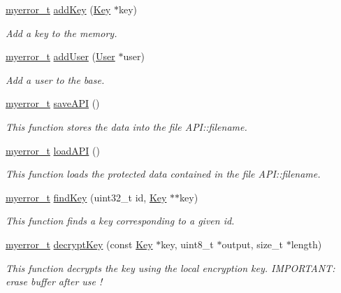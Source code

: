 \begin{DoxyCompactItemize}
\item 
\hyperlink{error_8hpp_acabd2917084445509becf54ab64a4bd0}{myerror\+\_\+t} \hyperlink{classAPI_a33f903bf549583040cbd4ced79821686}{add\+Key} (\hyperlink{classKey}{Key} $\ast$key)
\begin{DoxyCompactList}\small\item\em Add a key to the memory. \end{DoxyCompactList}\item 
\hyperlink{error_8hpp_acabd2917084445509becf54ab64a4bd0}{myerror\+\_\+t} \hyperlink{classAPI_abeba46623895fc9d5d831fb8f828e6da}{add\+User} (\hyperlink{classUser}{User} $\ast$user)
\begin{DoxyCompactList}\small\item\em Add a user to the base. \end{DoxyCompactList}\item 
\hyperlink{error_8hpp_acabd2917084445509becf54ab64a4bd0}{myerror\+\_\+t} \hyperlink{classAPI_ae9bf448b00701609e20c2167931b8975}{save\+A\+P\+I} ()
\begin{DoxyCompactList}\small\item\em This function stores the data into the file A\+P\+I\+::filename. \end{DoxyCompactList}\item 
\hyperlink{error_8hpp_acabd2917084445509becf54ab64a4bd0}{myerror\+\_\+t} \hyperlink{classAPI_a015f9ca96d3f5ab8af44fe2fe8e0215a}{load\+A\+P\+I} ()
\begin{DoxyCompactList}\small\item\em This function loads the protected data contained in the file A\+P\+I\+::filename. \end{DoxyCompactList}\item 
\hyperlink{error_8hpp_acabd2917084445509becf54ab64a4bd0}{myerror\+\_\+t} \hyperlink{classAPI_af91891e4a2d88f7cab665d9923452963}{find\+Key} (uint32\+\_\+t id, \hyperlink{classKey}{Key} $\ast$$\ast$key)
\begin{DoxyCompactList}\small\item\em This function finds a key corresponding to a given id. \end{DoxyCompactList}\item 
\hyperlink{error_8hpp_acabd2917084445509becf54ab64a4bd0}{myerror\+\_\+t} \hyperlink{classAPI_a01c135c01e7998c4d19f8ca5fa2df9ca}{decrypt\+Key} (const \hyperlink{classKey}{Key} $\ast$key, uint8\+\_\+t $\ast$output, size\+\_\+t $\ast$length)
\begin{DoxyCompactList}\small\item\em This function decrypts the key using the local encryption key. I\+M\+P\+O\+R\+T\+A\+N\+T\+: erase buffer after use ! \end{DoxyCompactList}\item 
$$
\end{DoxyCompactItemize}
